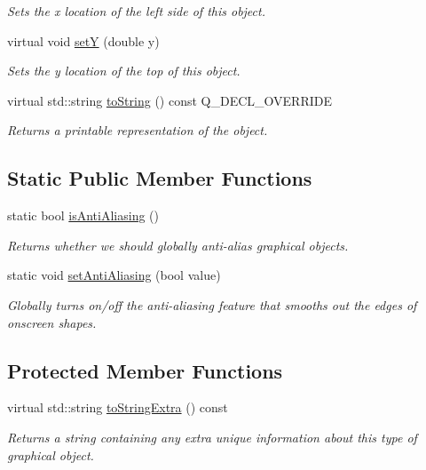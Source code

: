 \begin{DoxyCompactItemize}
\begin{DoxyCompactList}\small\item\em Sets the x location of the left side of this object. \end{DoxyCompactList}\item 
virtual void \mbox{\hyperlink{classGObject_a7d57e2a5c35d27feb58fd498a3cf82b9}{setY}} (double y)
\begin{DoxyCompactList}\small\item\em Sets the y location of the top of this object. \end{DoxyCompactList}\item 
virtual std\+::string \mbox{\hyperlink{classGCompound_add86bda25fd0c3b8edaedee9431b85e6}{to\+String}} () const Q\+\_\+\+D\+E\+C\+L\+\_\+\+O\+V\+E\+R\+R\+I\+DE
\begin{DoxyCompactList}\small\item\em Returns a printable representation of the object. \end{DoxyCompactList}\end{DoxyCompactItemize}
\subsection*{Static Public Member Functions}
\begin{DoxyCompactItemize}
\item 
static bool \mbox{\hyperlink{classGObject_a93be0e1fe1b1bf1a1da732470c94f42b}{is\+Anti\+Aliasing}} ()
\begin{DoxyCompactList}\small\item\em Returns whether we should globally anti-\/alias graphical objects. \end{DoxyCompactList}\item 
static void \mbox{\hyperlink{classGObject_a1e43371668ae850193cebedb44e1bbe3}{set\+Anti\+Aliasing}} (bool value)
\begin{DoxyCompactList}\small\item\em Globally turns on/off the anti-\/aliasing feature that smooths out the edges of onscreen shapes. \end{DoxyCompactList}\end{DoxyCompactItemize}
\subsection*{Protected Member Functions}
\begin{DoxyCompactItemize}
\item 
virtual std\+::string \mbox{\hyperlink{classGObject_a4fcdf8de5c6de92242a975d83d8f23ea}{to\+String\+Extra}} () const
\begin{DoxyCompactList}\small\item\em Returns a string containing any extra unique information about this type of graphical object. \end{DoxyCompactList}\end{DoxyCompactItemize}
